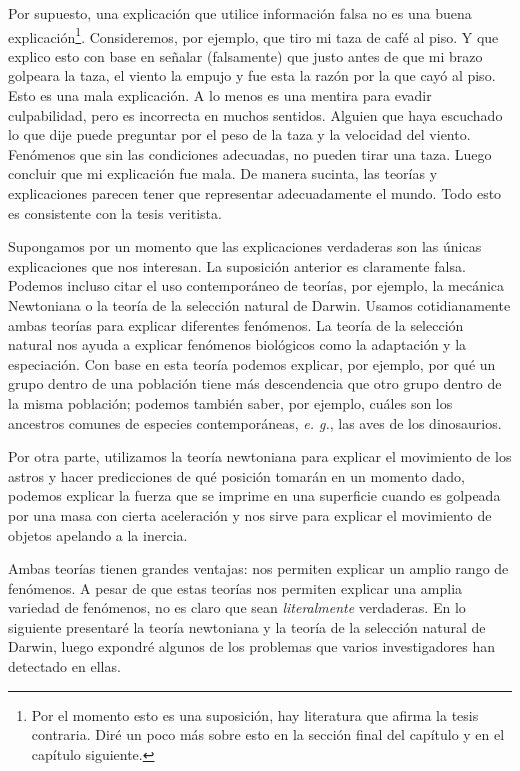 {{{{Por supuesto, una explicación que utilice información falsa no es una buena explicación\footnote{Por el momento esto es una suposición, hay literatura que afirma la tesis contraria. Diré un poco más sobre esto en la sección final del capítulo y en el capítulo siguiente.}.
Consideremos, por ejemplo, que tiro mi taza de café al piso.
Y que explico esto con base en señalar (falsamente) que justo antes de que mi brazo golpeara la taza, el viento la empujo y fue esta la razón por la que cayó al piso.
Esto es una mala explicación.
A lo menos es una mentira para evadir culpabilidad, pero es incorrecta en muchos sentidos.
Alguien que haya escuchado lo que dije puede preguntar por el peso de la taza y la velocidad del viento.
Fenómenos que sin las condiciones adecuadas, no pueden tirar una taza.
Luego concluir que mi explicación fue mala.
De manera sucinta, las teorías y explicaciones parecen tener que representar adecuadamente el mundo.
Todo esto es consistente con la tesis veritista.

Supongamos por un momento que las explicaciones verdaderas son las únicas explicaciones que nos interesan.
La suposición anterior es claramente falsa.
Podemos incluso citar el uso contemporáneo de teorías, por ejemplo, la mecánica Newtoniana o la teoría de la selección natural de Darwin.
Usamos cotidianamente ambas teorías para explicar diferentes fenómenos.
La teoría de la selección natural nos ayuda a explicar fenómenos biológicos como la adaptación y la especiación.
Con base en esta teoría podemos explicar, por ejemplo, por qué un grupo dentro de una población tiene más descendencia que otro grupo dentro de la misma población; podemos también saber, por ejemplo, cuáles son los ancestros comunes de especies contemporáneas, \textit{e. g.}, las aves de los dinosaurios.

Por otra parte, utilizamos la teoría newtoniana para explicar el movimiento de los astros y hacer predicciones de qué posición tomarán en un momento dado, podemos explicar la fuerza que se imprime en una superficie cuando es golpeada por una masa con cierta aceleración y nos sirve para explicar el movimiento de objetos apelando a la inercia.

Ambas teorías tienen grandes ventajas: nos permiten explicar un amplio rango de fenómenos.
A pesar de que estas teorías nos permiten explicar una amplia variedad de fenómenos, no es claro que sean \emph{literalmente} verdaderas.
En lo siguiente presentaré la teoría newtoniana y la teoría de la selección natural de Darwin, luego expondré algunos de los problemas que varios investigadores han detectado en ellas.

}}}}
